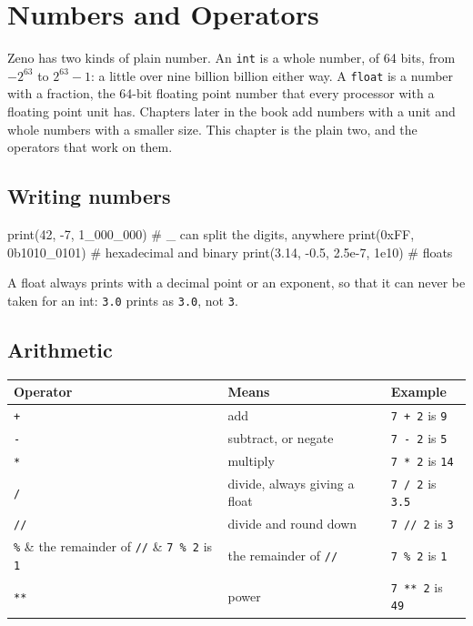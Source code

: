 \chapter{Numbers and Operators}\label{ch-numbers}

Zeno has two kinds of plain number. An \verb|int| is a whole number, of
64 bits, from $-2^{63}$ to $2^{63}-1$: a little over nine billion
billion either way. A
\verb|float| is a number with a fraction, the 64-bit floating point
number that every processor with a floating point unit has. Chapters
later in the book add numbers with a unit and whole numbers with a
smaller size. This chapter is the plain two, and the operators that
work on them.

\section{Writing numbers}

\begin{zeno}
print(42, -7, 1_000_000)          # _ can split the digits, anywhere
print(0xFF, 0b1010_0101)          # hexadecimal and binary
print(3.14, -0.5, 2.5e-7, 1e10)   # floats
\end{zeno}

A float always prints with a decimal point or an exponent, so that it
can never be taken for an int: \verb|3.0| prints as \verb|3.0|, not
\verb|3|.

\section{Arithmetic}

\begin{center}
\begin{tabular}{lll}
\toprule
Operator & Means & Example \\
\midrule
\verb|+| & add & \verb|7 + 2| is \verb|9| \\
\verb|-| & subtract, or negate & \verb|7 - 2| is \verb|5| \\
\verb|*| & multiply & \verb|7 * 2| is \verb|14| \\
\verb|/| & divide, always giving a float & \verb|7 / 2| is \verb|3.5| \\
\verb|//| & divide and round down & \verb|7 // 2| is \verb|3| \\
\verb|%| & the remainder of \verb|//| & \verb|7 % 2| is \verb|1| \\
\verb|**| & power & \verb|7 ** 2| is \verb|49| \\
\bottomrule
\end{tabular}
\end{center}

